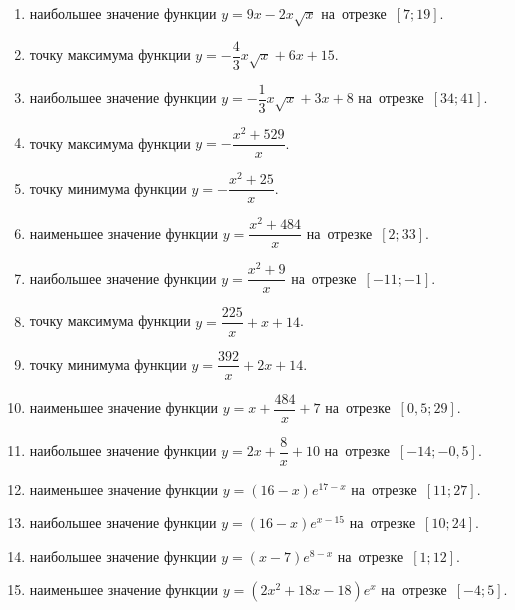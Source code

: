 \documentclass[a4paper,10pt]{article}
\begin{document}
\begin{enumerate}
\item {} наибольшее значение функции $y=9x -2x\sqrt{x}$ на~отрезке~$\left[7;19\right]$.

\item {} точку максимума функции $y=-\dfrac{4}{3}x\sqrt{x} +6x+15$.

\item {} наибольшее значение функции $y=-\dfrac{1}{3}x\sqrt{x} +3x+8$ на~отрезке~$\left[34;41\right]$.

\item {} точку максимума функции $y=-\dfrac{x^2 +529}{x}$.

\item {} точку минимума функции $y=-\dfrac{x^2 +25}{x}$.

\item {} наименьшее значение функции $y=\dfrac{x^2 +484}{x}$ на~отрезке~$\left[2;33\right]$.

\item {} наибольшее значение функции $y=\dfrac{x^2 +9}{x}$ на~отрезке~$\left[-11;-1\right]$.

\item {} точку максимума функции $y=\dfrac{225}{x} +x+14$.

\item {} точку минимума функции $y=\dfrac{392}{x} +2x+14$.

\item {} наименьшее значение функции $y=x+\dfrac{484}{x} +7$ на~отрезке~$\left[0,5;29\right]$.

\item {} наибольшее значение функции $y=2x+\dfrac{8}{x} +10$ на~отрезке~$\left[-14;-0,5\right]$.

\item {} наименьшее значение функции $y=\left(16-x\right)e^{17-x}$ на~отрезке~$\left[11;27\right]$.

\item {} наибольшее значение функции $y=\left(16-x\right)e^{x-15}$ на~отрезке~$\left[10;24\right]$.

\item {} наибольшее значение функции $y=\left(x-7\right)e^{8-x}$ на~отрезке~$\left[1;12\right]$.

\item {} наименьшее значение функции $y=\left(2x^2 +18x -18\right)e^{x }$ на~отрезке~$\left[-4;5\right]$.


\end{enumerate}
\end{document}

